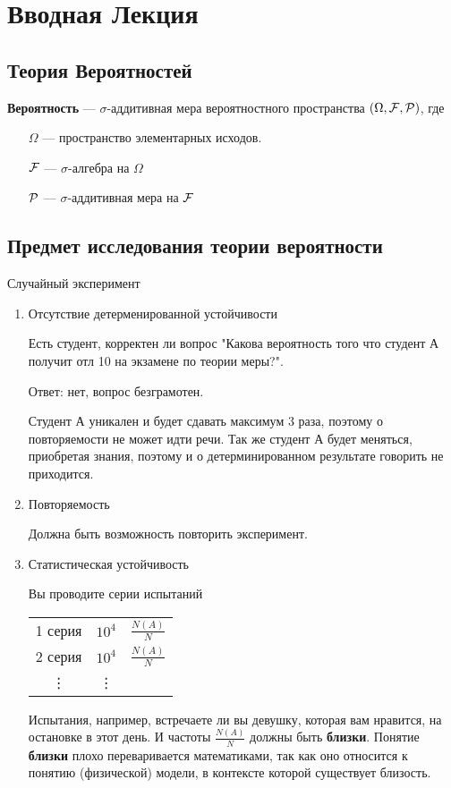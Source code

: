 \section{Вводная Лекция}

\subsection{Теория Вероятностей}

\begin{definition}
	\textbf{Вероятность} --- $\sigma$-аддитивная мера вероятностного пространства 
	$(\Omega, \mathcal{F}, \mathcal{P})$, где
	\begin{enumerate}
		\item[$\Omega$] --- пространство элементарных исходов.
		\item[$\mathcal{F}$]  --- $\sigma$-алгебра на $\Omega$
		\item[$\mathcal{P}$] --- $\sigma$-аддитивная мера на $\mathcal{F}$
	\end{enumerate}
\end{definition}

\subsection{Предмет исследования теории вероятности}

Случайный эксперимент
\begin{enumerate}
	\item Отсутствие детерменированной устойчивости
        \begin{example}
        Есть студент, корректен ли вопрос "Какова вероятность того что студент А получит отл 10 на экзамене по теории меры?". 
        \end{example}
		Ответ: нет, вопрос безграмотен.

        Студент А уникален и будет сдавать максимум 3 раза, поэтому о повторяемости не может идти речи. Так же студент А будет меняться, приобретая знания, поэтому и о детерминированном результате говорить не приходится.

	\item Повторяемость

		Должна быть возможность повторить эксперимент.

	\item Статистическая устойчивость

		Вы проводите серии испытаний
		\begin{center}
		\begin{tabular}{ c c c }
			1 серия & $10^4$ & $\frac{N(A)}{N}$ \\
			2 серия & $10^4$ & $\frac{N(A)}{N}$ \\
			\vdots  & \vdots &\\
		\end{tabular}
		\end{center}
		Испытания, например, встречаете ли вы девушку, которая вам нравится, на остановке в этот день.
		И частоты  $\frac{N(A)}{N}$ должны быть \textbf{близки}. Понятие \textbf{близки} плохо переваривается математиками, так как оно относится к понятию (физической) модели, в контексте которой существует близость.
		
\end{enumerate}

